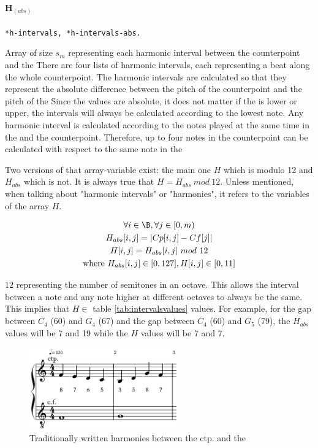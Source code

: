 \paragraph{H$_{(abs)}$} \texttt{*h-intervals, *h-intervals-abs.} %

Array of size $s_{m}$ representing each harmonic interval between the counterpoint and the \cfdot There are four lists of harmonic intervals, each representing a beat along the whole counterpoint. The harmonic intervals are calculated so that they represent the absolute difference between the pitch of the counterpoint and the pitch of the \cfdot Since the values are absolute, it does not matter if the \cf is lower or upper, the intervals will always be calculated according to the lowest note. Any harmonic interval is calculated according to the notes played at the same time in the \cf and the counterpoint. Therefore, up to four notes in the counterpoint can be calculated with respect to the same note in the \cfdot

Two versions of that array-variable exist: the main one $H$ which is modulo 12 and $H_{abs}$ which is not. It is always true that $H = H_{abs}\ mod\ 12$. Unless mentioned, when talking about "harmonic intervals" or "harmonies", it refers to the variables of the array $H$.

\begin{equation}
    \begin{gathered}
        \forall i \in \B, \forall j \in [0, m)\\
        H_{abs}[i, j] = \left|Cp[i, j] - Cf[j]\right|\\
        H[i, j] = H_{abs}[i, j]\ mod\ 12\\
        \text{where } H_{abs}[i, j] \in [0, 127], H[i, j] \in [0, 11]
    \end{gathered}
\end{equation}

$12$ representing the number of semitones in an octave. This allows the interval between a note and any note higher at different octaves to always be the same. This implies that $H \in$ table \ref{tab:intervalsvalues} values. For example, for the gap between $C_4$ (60) and $G_4$ (67) and the gap between $C_4$ (60) and $G_5$ (79), the $H_{abs}$ values will be 7 and 19 while the $H$ values will be 7 and 7.

\begin{figure}[h]
    \centering
    \includegraphics[width=2.5in]{Images/harmonic_intervals_variables.png}
    \caption{Traditionally written harmonies between the ctp. and the \cfdot}
    \label{fig:harmonicintervals}
\end{figure}

